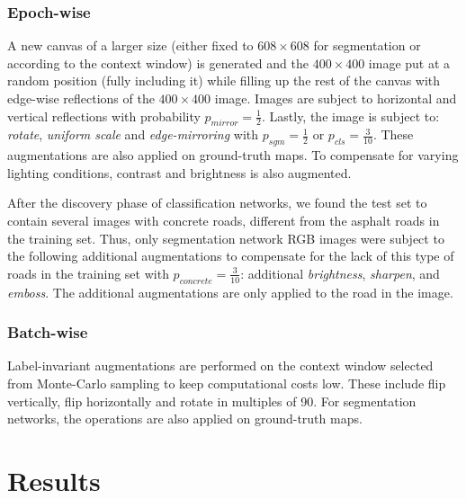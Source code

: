 \documentclass[10pt,conference,compsocconf]{IEEEtran}
\begin{document}
\subsubsection{Epoch-wise}
A new canvas of a larger size (either fixed to $608 \times 608$ for segmentation or according to the context window) is generated and the $400 \times 400$ image put at a random position (fully including it) while filling up the rest of the canvas with edge-wise reflections of the $400 \times 400$ image. Images are subject to horizontal and vertical reflections with probability $p_{mirror} = \tfrac{1}{2}$. Lastly, the image is subject to: \emph{rotate}, \emph{uniform scale} and \emph{edge-mirroring} with $p_{sgm} = \tfrac{1}{2}$ or $p_{cls} = \tfrac{3}{10}$.
These augmentations are also applied on ground-truth maps. To compensate for varying lighting conditions, contrast and brightness is also augmented.

After the discovery phase of classification networks, we found the test set to contain several images with concrete roads, different from the asphalt roads in the training set. Thus, only segmentation network RGB images were subject to the following additional augmentations to compensate for the lack of this type of roads in the training set with $p_{concrete} = \tfrac{3}{10}$: additional \emph{brightness}, \emph{sharpen}, and \emph{emboss}. The additional augmentations are only applied to the road in the image.

\subsubsection{Batch-wise}
Label-invariant augmentations are performed on the context window selected from Monte-Carlo sampling to keep computational costs low. These include flip vertically, flip horizontally and rotate in multiples of 90\textdegree. For segmentation networks, the operations are also applied on ground-truth maps.

\section{Results}
\label{sec:results}
\end{document}
